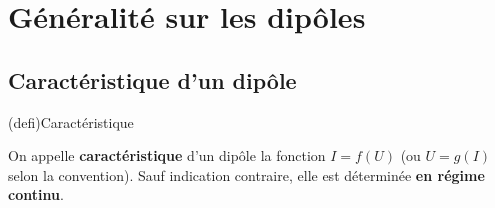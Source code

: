 \documentclass[../../main/main.tex]{subfiles}
\begin{document}
\vspace*{\fill}

\newpage

\section{Généralité sur les dipôles}
\subsection{Caractéristique d'un dipôle}
\begin{tcbraster}[raster columns=2, raster equal height=rows]
	\begin{tcb*}[label=def:dipcara](defi){Caractéristique}

		On appelle \textbf{caractéristique} d'un dipôle la fonction $I = f(U)$
		(ou $U = g(I)$ selon la convention). Sauf indication contraire, elle est
		déterminée \textbf{en régime continu}.


\end{tcb*}
\end{tcbraster}
\end{document}
